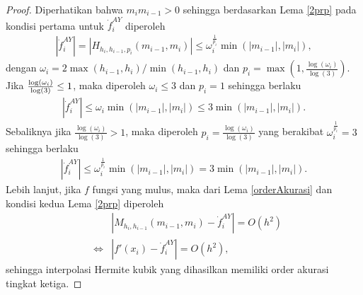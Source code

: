 \begin{proof}
    Diperhatikan bahwa $m_im_{i-1} > 0$ sehingga berdasarkan Lema \ref{2prp} pada kondisi pertama untuk $\dot{f}_i^{AY}$ diperoleh
    \begin{align*}
        |\dot{f}_i^{AY}| = |H_{h_i,h_{i-1},p_i}(m_{i-1},m_i)| \leq \omega_i^{\frac{1}{p_i}}\min(|m_{i-1}|,|m_i|),
    \end{align*}
    dengan $\omega_i = 2\max(h_{i-1},h_i)/\min(h_{i-1},h_i)$ dan $p_i=\max(1,\frac{\log(\omega_i)}{\log(3)})$. Jika $\\\frac{\log(\omega_i)}{\log(3)} \leq 1$, maka diperoleh $\omega_i \leq 3$ dan $p_i=1$ sehingga berlaku
    \begin{align*}
        |\dot{f}_i^{AY}| \leq \omega_i\min(|m_{i-1}|,|m_i|) \leq 3 \min(|m_{i-1}|,|m_i|).
    \end{align*}
    Sebaliknya jika $\frac{\log(\omega_i)}{\log(3)} > 1$, maka diperoleh $p_i=\frac{\log(\omega_i)}{\log(3)}$ yang berakibat $\omega_i^{\frac{1}{p_i}} = 3$ sehingga berlaku
    \begin{align*}
        |\dot{f}_i^{AY}| \leq \omega_i^{\frac{1}{p_i}}\min(|m_{i-1}|,|m_i|) = 3 \min(|m_{i-1}|,|m_i|).
    \end{align*}
    Lebih lanjut, jika $f$ fungsi yang mulus, maka dari Lema \ref{orderAkurasi} dan kondisi kedua Lema \ref{2prp} diperoleh 
    \begin{align*}
            &&|M_{h_i,h_{i-1}}(m_{i-1},m_i) - \dot{f}_i^{AY}| = O(h^2) \\
            &\Leftrightarrow&|f'(x_i) - \dot{f}_i^{AY}| = O(h^2),
    \end{align*}
    sehingga interpolasi Hermite kubik yang dihasilkan memiliki order akurasi  tingkat ketiga.
\end{proof}
